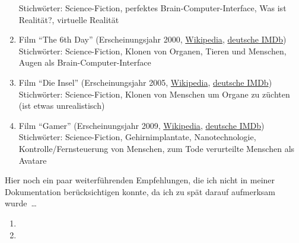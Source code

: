 \begin{enumerate}
		Stichwörter: Science-Fiction, perfektes Brain-Computer-Interface,
		Was ist Realität?, virtuelle Realität
	\item Film \enquote{The 6th Day}
		(Erscheinungsjahr 2000, \href{http://de.wikipedia.org/wiki/The_6th_Day}{Wikipedia},
		\href{http://www.imdb.de/title/tt0216216/}{deutsche IMDb}) \\
		Stichwörter: Science-Fiction, Klonen von Organen, Tieren und Menschen,
			Augen als Brain-Computer-Interface
	\item Film \enquote{Die Insel}
		(Erscheinungsjahr 2005, \href{http://de.wikipedia.org/wiki/Die_Insel_(2005)}{Wikipedia},
		\href{http://www.imdb.de/title/tt0399201/}{deutsche IMDb}) \\
		Stichwörter: Science-Fiction, Klonen von Menschen um Organe zu züchten
			(ist etwas unrealistisch)
	\item Film \enquote{Gamer}
		(Erscheinungsjahr 2009, \href{http://de.wikipedia.org/wiki/Gamer}{Wikipedia},
		\href{http://www.imdb.de/title/tt1034032/}{deutsche IMDb}) \\
		Stichwörter: Science-Fiction, Gehirnimplantate, Nanotechnologie,
			Kontrolle/Fernsteuerung von Menschen,
			zum Tode verurteilte Menschen als Avatare
\end{enumerate}

Hier noch ein paar weiterführenden Empfehlungen, die ich nicht in meiner Dokumentation
berücksichtigen konnte, da ich zu spät darauf aufmerksam wurde~\dots
\begin{enumerate}
	\item {}
	\item {}
\end{enumerate}



